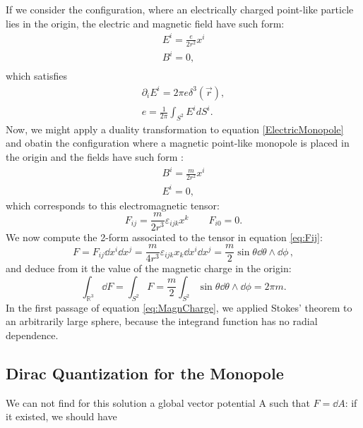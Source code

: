 \documentclass[main.tex]{subfiles}
\begin{document}
%
If we consider the configuration, where an electrically charged point-like particle lies in the origin, the electric and magnetic field have such form:
\begin{gather}\label{ElectricMonopole}
E^i=\frac{e}{2r^2}x^i \\
B^i =0,\\
\end{gather}
%
which satisfies
%
\begin{subequations}
\begin{align}
\partial_i E^i=2\pi e \delta^3(\vec r),\\
e=\frac{1}{2\pi}\int_{S^2} E^i d S^i.
\end{align}
\end{subequations}
%
Now, we might apply a duality transformation to equation \eqref{ElectricMonopole} and obatin the configuration where a magnetic point-like monopole is placed in the origin and the fields have such form :
%
\begin{gather}
\label{MagneticMonopole}
B^i=\frac{m}{2r^2}x^i\\
E^i=0,
\end{gather}
%
which corresponds to this electromagnetic tensor:
\begin{equation}\label{eq:Fij}
F_{ij}=\frac{m}{2r^3}\varepsilon_{ijk}x^k \qquad F_{i0}=0.
\end{equation}
%
We now compute the 2-form associated to the tensor in equation \ref{eq:Fij}:
%
\begin{equation}
F=F_{ij}\dd{x^i}\dd{x^j}=\frac{m}{4r^3}\varepsilon_{ijk}x_k\dd{x^i}\dd{x^j}=\frac{m}{2}\sin\theta \dd{\theta}\wedge \dd{\phi}\,,
\end{equation}
%
and deduce from it the value of the magnetic charge in the origin:
%
\begin{equation} \label{eq:MagnCharge}
\int_{\mathbb R^3} \dd{F} = \int_{S^2} F=\frac{m}{2}\int_{S^2}\sin\theta \dd{\theta}\wedge \dd{\phi}=2\pi m .
\end{equation}
%
In the first passage of equation \ref{eq:MagnCharge}, we applied Stokes' theorem to an arbitrarily large sphere, because the integrand function has no radial dependence.

\subsection{Dirac Quantization for the Monopole}
We can not find for this solution a global vector potential A such that $F=\dd{A}$: if it existed, we should have
\end{document}
